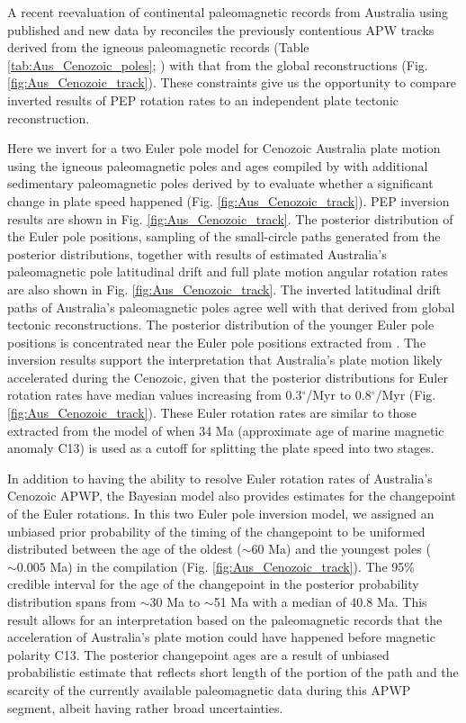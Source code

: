 \documentclass[11pt,letterpaper]{article}
\begin{document}
A recent reevaluation of continental paleomagnetic records from Australia using published and new data by \cite{Hansma2019a} reconciles the previously contentious APW tracks derived from the igneous paleomagnetic records (Table \ref{tab:Aus_Cenozoic_poles}; \cite{Idnurm1985a, Idnurm1994a, Musgrave1989a, Opdyke2004a, Hansma2018a}) with that from the global reconstructions (Fig. \ref{fig:Aus_Cenozoic_track}). These constraints give us the opportunity to compare inverted results of PEP rotation rates to an independent plate tectonic reconstruction.

Here we invert for a two Euler pole model for Cenozoic Australia plate motion using the igneous paleomagnetic poles and ages compiled by \cite{Hansma2019a} with additional sedimentary paleomagnetic poles derived by \cite{Idnurm1985a} to evaluate whether a significant change in plate speed happened (Fig. \ref{fig:Aus_Cenozoic_track}). PEP inversion results are shown in Fig. \ref{fig:Aus_Cenozoic_track}. The posterior distribution of the Euler pole positions, sampling of the small-circle paths generated from the posterior distributions, together with results of estimated Australia's paleomagnetic pole latitudinal drift and full plate motion angular rotation rates are also shown in Fig. \ref{fig:Aus_Cenozoic_track}. The inverted latitudinal drift paths of Australia's paleomagnetic poles agree well with that derived from global tectonic reconstructions. The posterior distribution of the younger Euler pole positions is concentrated near the Euler pole positions extracted from \cite{Muller2016a}. The inversion results support the interpretation that Australia's plate motion likely accelerated during the Cenozoic, given that the posterior distributions for Euler rotation rates have median values increasing from 0.3$^\circ$/Myr to 0.8$^\circ$/Myr (Fig. \ref{fig:Aus_Cenozoic_track}). These Euler rotation rates are similar to those extracted from the model of \cite{Muller2016a} when 34 Ma (approximate age of marine magnetic anomaly C13) is used as a cutoff for splitting the plate speed into two stages. 

In addition to having the ability to resolve Euler rotation rates of Australia's Cenozoic APWP, the Bayesian model also provides estimates for the changepoint of the Euler rotations. In this two Euler pole inversion model, we assigned an unbiased prior probability of the timing of the changepoint to be uniformed distributed between the age of the oldest ($\sim60$ Ma) and the youngest poles ($\sim0.005$ Ma) in the compilation (Fig. \ref{fig:Aus_Cenozoic_track}). The 95\% credible interval for the age of the changepoint in the posterior probability distribution spans from $\sim$30 Ma to $\sim$51 Ma with a median of 40.8 Ma. This result allows for an interpretation based on the paleomagnetic records that the acceleration of Australia's plate motion could have happened before magnetic polarity C13. The posterior changepoint ages are a result of unbiased probabilistic estimate that reflects short length of the portion of the path and the scarcity of the currently available paleomagnetic data during this APWP segment, albeit having rather broad uncertainties. 
\end{document}
